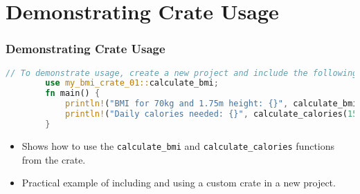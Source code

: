 \documentclass[aspectratio=169, table]{beamer}
\begin{document}
\section{Demonstrating Crate Usage}
\begin{frame}[fragile]
	\frametitle{Demonstrating Crate Usage}
	\begin{lstlisting}[language=Rust]
		// To demonstrate usage, create a new project and include the following crate:
		use my_bmi_crate_01::calculate_bmi; 
		fn main() {
			println!("BMI for 70kg and 1.75m height: {}", calculate_bmi(70.0, 1.75));
			println!("Daily calories needed: {}", calculate_calories(1500.0, 1.2));
		}
	\end{lstlisting}
	\begin{itemize}
		\item Shows how to use the \texttt{calculate\_bmi} and \texttt{calculate\_calories} functions from the crate.
		\item Practical example of including and using a custom crate in a new project.
	\end{itemize}
\end{frame}
\end{document}
